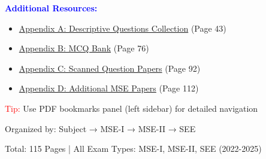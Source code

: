 \documentclass[11pt,a4paper]{article}
\begin{document}
\begin{titlepage}
\vspace{1.5cm}
{\large\bfseries\textcolor{blue}{Additional Resources:}\par}
\vspace{0.5cm}

\begin{itemize}
\item \hyperlink{appendix.A}{Appendix A: Descriptive Questions Collection} (Page 43)
\item \hyperlink{appendix.B}{Appendix B: MCQ Bank} (Page 76)
\item \hyperlink{appendix.C}{Appendix C: Scanned Question Papers} (Page 92)
\item \hyperlink{appendix.D}{Appendix D: Additional MSE Papers} (Page 112)
\end{itemize}

\vspace{1cm}
{\large\textcolor{red}{Tip:} Use PDF bookmarks panel (left sidebar) for detailed navigation\par}

\vfill
{\large Organized by: Subject → MSE-I → MSE-II → SEE\par}
\vspace{0.3cm}
{\small Total: 115 Pages | All Exam Types: MSE-I, MSE-II, SEE (2022-2025)\par}
\end{titlepage}

\tableofcontents
\newpage

\hypertarget{section.1}{}


\hypertarget{appendix.A}{}


\hypertarget{appendix.B}{}


\hypertarget{appendix.C}{}


\hypertarget{appendix.D}{}







\end{document}
